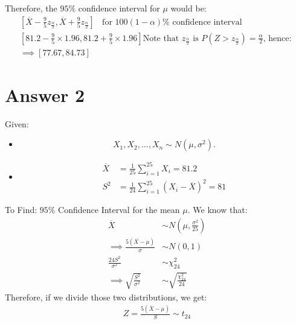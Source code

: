 \documentclass[a4paper]{article}
\begin{document}
Therefore, the $95\%$ confidence interval for  $\mu$ would be:
 \begin{equation*}
 	\begin{split}
		\left[ \overline{X} - \frac{9}{5}z_\frac{\alpha}{2} , \overline{X} + \frac{9}{5}z_\frac{\alpha}{2} \right] \; \; \text{ for $100\left( 1-\alpha \right) \%$ confidence interval}\\
		\left[ 81.2 - \frac{9}{5}\times 1.96, 81.2 + \frac{9}{5}\times 1.96 \right] \text{Note that $z_\frac{\alpha}{2}$ is $P\left( Z>z_\frac{\alpha}{2} \right) = \frac{\alpha}{2}$, hence: }\\
		\implies\left[ 77.67, 84.73 \right] 
 	\end{split}
 \end{equation*}
 \newpage
 \section{Answer 2}
 Given:
 \begin{itemize}
	 \item {\[
				 X_1,X_2,\dots,X_n \sim N\left( \mu,\sigma^2 \right) 
	 .\] }
 \item{
	 \begin{equation*}
	 	\begin{split}
			\overline{X} &=  \frac{1}{25} \sum_{i=1}^{25} X_i = 81.2\\
			S^2 &=  \frac{1}{24} \sum_{i=1}^{25} \left( X_i - \overline{X} \right) ^2 = 81
	 	\end{split}
	 \end{equation*}
	 }
 \end{itemize}
 To Find: $95\%$ Confidence Interval for the mean  $\mu$.
\newline\newline
We know that:
\begin{equation*}
	\begin{split}
		\overline{X} &\sim N\left( \mu,\frac{\sigma^2}{25} \right) \\
		\implies \frac{5\left( \overline{X} - \mu \right) }{\sigma} &\sim N\left( 0,1 \right)\\ 
		\frac{24S^2}{\sigma^2} &\sim \chi^2_{24}\\
		\implies \sqrt{\frac{S^2}{\sigma^2}} &\sim \sqrt{ \frac{\chi^2_{24}}{24}} 
	\end{split}
\end{equation*}
Therefore, if we divide those two distributions, we get:
\begin{equation*}
	\begin{split}
	Z =	\frac{5\left( \overline{X} - \mu  \right) }{S} \sim t_{24} 
	\end{split}
\end{equation*}
\end{document}
